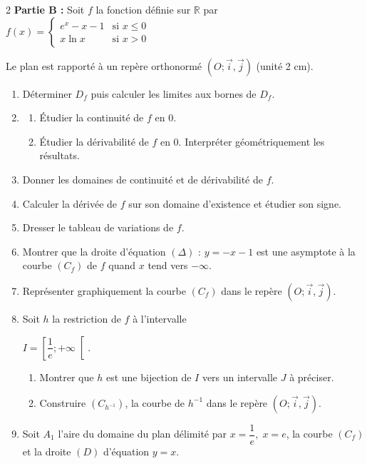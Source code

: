 \documentclass[12pt,a4paper]{article}
\begin{document}
\begin{multicols}{2}
\textbf{Partie B :} Soit $f$ la fonction définie sur $\mathbb{R}$ par
\(
f(x)=
\begin{cases}
e^x-x-1 & \text{si } x\leq 0 \\[0.3cm]
x\ln x & \text{si } x>0
\end{cases}
\)

Le plan est rapporté à un repère orthonormé $(O;\vec{i},\vec{j})$ (unité 2 cm).

\begin{enumerate}
\item Déterminer $D_f$ puis calculer les limites aux bornes de $D_f$.

\item 
\begin{enumerate}
\item Étudier la continuité de $f$ en $0$.
\item Étudier la dérivabilité de $f$ en $0$. Interpréter géométriquement les résultats.
\end{enumerate}

\item Donner les domaines de continuité et de dérivabilité de $f$.

\item Calculer la dérivée de $f$ sur son domaine d’existence et étudier son signe.

\item Dresser le tableau de variations de $f$.

\item Montrer que la droite d’équation $(\Delta)$ : \( y=-x-1 \) est une asymptote à la courbe $(C_f)$ de $f$ quand $x$ tend vers $-\infty$.

\item Représenter graphiquement la courbe $(C_f)$ dans le repère $(O;\vec{i},\vec{j})$.

\item Soit $h$ la restriction de $f$ à l’intervalle  

\( I=\left[\dfrac{1}{e};+\infty\right[. \)

\begin{enumerate}
\item Montrer que $h$ est une bijection de $I$ vers un intervalle $J$ à préciser.
\item Construire $(C_{h^{-1}})$, la courbe de $h^{-1}$ dans le repère $(O;\vec{i},\vec{j})$.
\end{enumerate}
\item Soit $A_1$ l’aire du domaine du plan délimité par  
\( x=\dfrac{1}{e}, \; x=e \), la courbe $(C_f)$ et la droite $(D)$ d’équation \( y=x \).


\end{enumerate}
\end{multicols}
\end{document}
